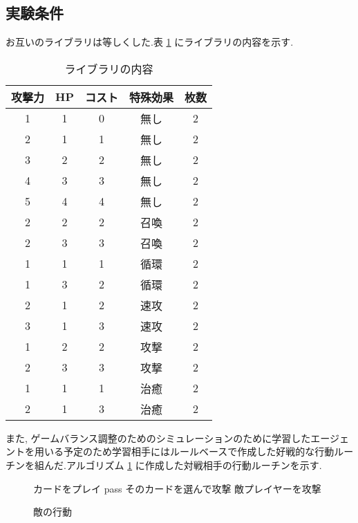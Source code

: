 \documentclass{jarticle}     %
\begin{document}
 \subsection{実験条件}
 お互いのライブラリは等しくした.表 \ref{table:deck} にライブラリの内容を示す.
 \begin{table}[h]
  \centering
  \caption{ライブラリの内容}
  \label{table:deck}
  \begin{tabular}{|c|c|c|c|c|}
  \hline
  攻撃力 & HP & コスト & 特殊効果 & 枚数 \\ \hline
  1 & 1 & 0 & 無し & 2 \\ \hline
  2 & 1 & 1 & 無し & 2 \\ \hline
  3 & 2 & 2 & 無し & 2 \\ \hline
  4 & 3 & 3 & 無し & 2 \\ \hline
  5 & 4 & 4 & 無し & 2 \\ \hline
  2 & 2 & 2 & 召喚 & 2 \\ \hline
  2 & 3 & 3 & 召喚 & 2 \\ \hline
  1 & 1 & 1 & 循環 & 2 \\ \hline
  1 & 3 & 2 & 循環 & 2 \\ \hline
  2 & 1 & 2 & 速攻 & 2 \\ \hline
  3 & 1 & 3 & 速攻 & 2 \\ \hline
  1 & 2 & 2 & 攻撃 & 2 \\ \hline
  2 & 3 & 3 & 攻撃 & 2 \\ \hline
  1 & 1 & 1 & 治癒 & 2 \\ \hline
  2 & 1 & 3 & 治癒 & 2 \\ \hline
  \end{tabular}
  \end{table}

また, ゲームバランス調整のためのシミュレーションのために学習したエージェントを用いる予定のため学習相手にはルールベースで作成した好戦的な行動ルーチンを組んだ.アルゴリズム \ref{alg1} に作成した対戦相手の行動ルーチンを示す.
\begin{figure}[ht]
  \begin{algorithm}[H]
      \caption{敵の行動}
      \label{alg1}
      \begin{algorithmic}[1] 
      \STATE カードをプレイ
      \ELSE
      \STATE pass
      \ENDIF
      \ENDFOR
      \STATE そのカードを選んで攻撃
      \ELSE
      \STATE 敵プレイヤーを攻撃
      \ENDIF
      \ENDFOR
      \end{algorithmic}
  \end{algorithm}
\end{figure}
\end{document}
